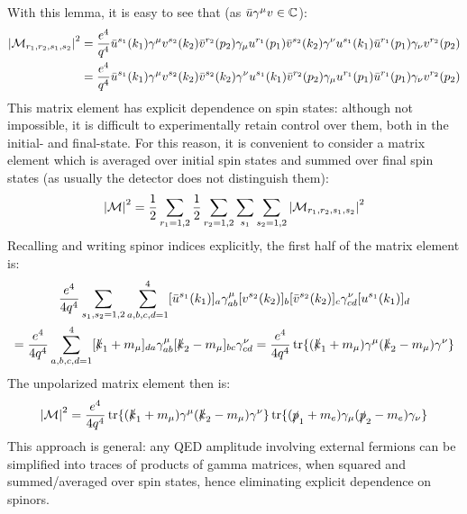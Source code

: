 With this lemma, it is easy to see that (as $ \bar{u} \gamma^\mu v \in \mathbb{C} $):
\begin{equation*}
  \begin{split}
    \left\lvert\mathcal{M}_{r_1,r_2,s_1,s_2}\right\rvert^2
    & = \frac{e^4}{q^4} \bar{u}^{s_1}(k_1) \gamma^\mu v^{s_2}(k_2) \bar{v}^{r_2}(p_2) \gamma_\mu u^{r_1}(p_1) \bar{v}^{s_2}(k_2) \gamma^\nu u^{s_1}(k_1) \bar{u}^{r_1}(p_1) \gamma_\nu v^{r_2}(p_2) \\
    & = \frac{e^4}{q^4} \bar{u}^{s_1}(k_1) \gamma^\mu v^{s_2}(k_2) \bar{v}^{s_2}(k_2) \gamma^\nu u^{s_1}(k_1) \bar{v}^{r_2}(p_2) \gamma_\mu u^{r_1}(p_1) \bar{u}^{r_1}(p_1) \gamma_\nu v^{r_2}(p_2)
  \end{split}
\end{equation*}
This matrix element has explicit dependence on spin states: although not impossible, it is difficult to experimentally retain control over them, both in the initial- and final-state. For this reason, it is convenient to consider a matrix element which is averaged over initial spin states and summed over final spin states (as usually the detector does not distinguish them):
\begin{equation}
  \left\lvert\mathcal{M}\right\rvert^2 = \frac{1}{2} \sum_{r_1 = 1,2} \frac{1}{2} \sum_{r_2 = 1,2} \sum_{s_1} \sum_{s_2 = 1,2} \left\lvert\mathcal{M}_{r_1,r_2,s_1,s_2}\right\rvert^2
\end{equation}
Recalling  and writing spinor indices explicitly, the first half of the matrix element is:
\begin{multline*}
  \frac{e^4}{4q^4} \sum_{s_1,s_2 = 1,2} \sum_{a,b,c,d = 1}^{4} [\bar{u}^{s_1}(k_1)]_a \gamma^\mu_{ab} [v^{s_2}(k_2)]_b [\bar{v}^{s_2}(k_2)]_c \gamma^\nu_{cd} [u^{s_1}(k_1)]_d \\
  = \frac{e^4}{4q^4} \sum_{a,b,c,d = 1}^{4} [\slashed{k}_1 + m_\mu]_{da} \gamma^\mu_{ab} [\slashed{k}_2 - m_\mu]_{bc} \gamma^\nu_{cd} = \frac{e^4}{4q^4} \operatorname{tr}\{(\slashed{k}_1 + m_\mu) \gamma^\mu (\slashed{k}_2 - m_\mu) \gamma^\nu\}
\end{multline*}
The unpolarized matrix element then is:
\begin{equation}
  \left\lvert\mathcal{M}\right\rvert^2 = \frac{e^4}{4q^4} \operatorname{tr}\{(\slashed{k}_1 + m_\mu) \gamma^\mu (\slashed{k}_2 - m_\mu) \gamma^\nu\} \operatorname{tr}\{(\slashed{p}_1 + m_e) \gamma_\mu (\slashed{p}_2 - m_e) \gamma_\nu\}
  \label{eq:unp-mat-el-pre}
\end{equation}
This approach is general: any QED amplitude involving external fermions can be simplified into traces of products of gamma matrices, when squared and summed/averaged over spin states, hence eliminating explicit dependence on spinors.

